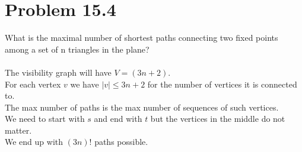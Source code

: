 \documentclass[11pt,psfig]{article}
\begin{document}
\newpage

\section*{Problem 15.4}

What is the maximal number of shortest paths connecting two ﬁxed
points among a set of n triangles in the plane?\\
\\
The visibility graph will have $V = (3n+2)$.\\
For each vertex $v$ we have $|v| \leq 3n + 2$ for the number of vertices it is connected to. \\
The max number of paths is the max number of sequences of such vertices. \\
We need to start with $s$ and end with $t$ but the vertices in the middle do not matter. \\
We end up with $(3n)!$ paths possible. 
\end{document}
